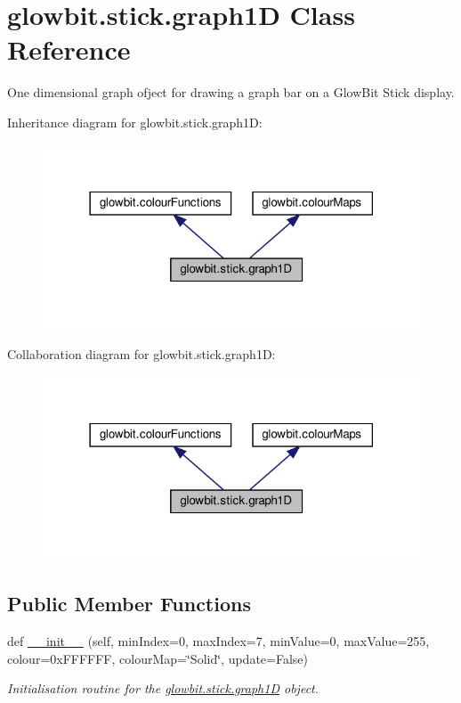 \hypertarget{classglowbit_1_1stick_1_1graph1D}{}\section{glowbit.\+stick.\+graph1D Class Reference}
\label{classglowbit_1_1stick_1_1graph1D}


One dimensional graph ofject for drawing a graph bar on a Glow\+Bit Stick display.  




Inheritance diagram for glowbit.\+stick.\+graph1D\+:\nopagebreak
\begin{figure}[H]
\begin{center}
\leavevmode
\includegraphics[width=318pt]{classglowbit_1_1stick_1_1graph1D__inherit__graph}
\end{center}
\end{figure}


Collaboration diagram for glowbit.\+stick.\+graph1D\+:\nopagebreak
\begin{figure}[H]
\begin{center}
\leavevmode
\includegraphics[width=318pt]{classglowbit_1_1stick_1_1graph1D__coll__graph}
\end{center}
\end{figure}
\subsection*{Public Member Functions}
\begin{DoxyCompactItemize}
\item 
def \hyperlink{classglowbit_1_1stick_1_1graph1D_aebaa1206d7af5e1a1797bfdc6113cba8}{\+\_\+\+\_\+init\+\_\+\+\_\+} (self, min\+Index=0, max\+Index=7, min\+Value=0, max\+Value=255, colour=0x\+F\+F\+F\+F\+F\+F, colour\+Map=\char`\"{}\+Solid\char`\"{}, update=\+False)
\begin{DoxyCompactList}\small\item\em Initialisation routine for the \hyperlink{classglowbit_1_1stick_1_1graph1D}{glowbit.\+stick.\+graph1D} object. \end{DoxyCompactList}\end{DoxyCompactItemize}
